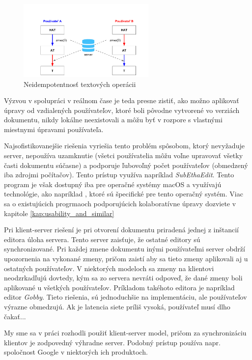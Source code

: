 \begin{figure}[H]
\centerline{\includegraphics[width=0.6\textwidth]{images/neidempotentne_operacie}}
\caption[Neidempotentnosť textových operácii]{Neidempotentnosť textových operácii}
\label{obr:neidempotentnost}
\end{figure}

Výzvou v spolupráci v reálnom čase je teda presne zistiť, ako možno aplikovať úpravy od vzdialených
používateľov, ktoré boli pôvodne vytvorené vo verziách dokumentu, nikdy lokálne neexistovali a môžu
byť v rozpore s vlastnými miestnymi úpravami používateľa. 

Najsofistikovanejšie riešenia vyriešia tento problém spôsobom, ktorý nevyžaduje server, nepoužíva
uzamknutie (všetci používatelia môžu voľne upravovať všetky časti dokumentu súčasne) a podporuje
ľubovoľný počet používateľov (obmedzený iba zdrojmi počítačov). Tento prístup využíva napríklad
\textit{SubEthaEdit}. Tento program je však dostupný iba pre operačné systémy macOS a využívajú
technológie, ako napríklad \cite{bonjour}, ktoré sú špecifické pre tento operačný systém. Viac sa o
existujúcich progrmaoch podporujúcich kolaboratívne úpravy dozviete v kapitole \ref{kap:usability_and_similar}

Pri klient-server riešení je pri otvorení dokumentu priradená jednej z inštancií editora
úloha servera. Tento server zaisťuje, že ostatné editory sú synchronizované. Pri každej zmene
dokumentu inými používateľmi server obdrží upozornenia na vykonané zmeny, pričom zaistí aby
sa tieto zmeny aplikovali aj u ostatných používateľov. 
V niektorých modeloch sa zmeny na klientovi neodzrkadľujú dovtedy,
kým sa zo servera nevráti odpoveď, že dané zmeny boli aplikované u všetkých používateľov.
Príkladom takéhoto editora je napríklad editor \textit{Gobby}. Tieto riešenia, sú 
jednoduchšie na implementáciu, ale používateľov výrazne obmedzujú. Ak je latencia siete
príliš vysoká, používateľ musí dlho čakať...

My sme sa v práci rozhodli použiť klient-server model, pričom za synchronizáciu klientov
je zodpovedný výhradne server. Podobný prístup používa napr. spoločnost Google v 
niektorých ich produktoch.


